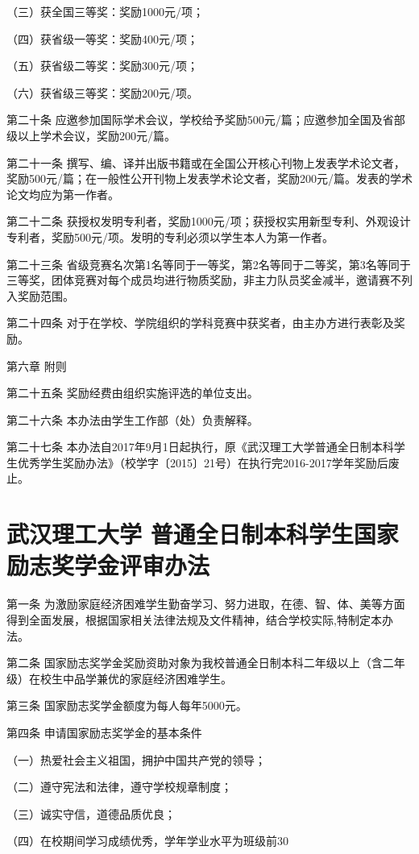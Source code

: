 \documentclass[UTF8,12pt,a4paper]{report}
\begin{document}
（三）获全国三等奖：奖励1000元/项；

（四）获省级一等奖：奖励400元/项；

（五）获省级二等奖：奖励300元/项；

（六）获省级三等奖：奖励200元/项。

第二十条  应邀参加国际学术会议，学校给予奖励500元/篇；应邀参加全国及省部级以上学术会议，奖励200元/篇。

第二十一条  撰写、编、译并出版书籍或在全国公开核心刊物上发表学术论文者，奖励500元/篇；在一般性公开刊物上发表学术论文者，奖励200元/篇。发表的学术论文均应为第一作者。

第二十二条  获授权发明专利者，奖励1000元/项；获授权实用新型专利、外观设计专利者，奖励500元/项。发明的专利必须以学生本人为第一作者。

第二十三条  省级竞赛名次第1名等同于一等奖，第2名等同于二等奖，第3名等同于三等奖，团体竞赛对每个成员均进行物质奖励，非主力队员奖金减半，邀请赛不列入奖励范围。

第二十四条  对于在学校、学院组织的学科竞赛中获奖者，由主办方进行表彰及奖励。



第六章  附则

第二十五条  奖励经费由组织实施评选的单位支出。

第二十六条  本办法由学生工作部（处）负责解释。

第二十七条  本办法自2017年9月1日起执行，原《武汉理工大学普通全日制本科学生优秀学生奖励办法》（校学字〔2015〕21号）在执行完2016-2017学年奖励后废止。
\chapter{武汉理工大学 普通全日制本科学生国家励志奖学金评审办法}
第一条 为激励家庭经济困难学生勤奋学习、努力进取，在德、智、体、美等方面得到全面发展，根据国家相关法律法规及文件精神，结合学校实际,特制定本办法。

第二条 国家励志奖学金奖励资助对象为我校普通全日制本科二年级以上（含二年级）在校生中品学兼优的家庭经济困难学生。

第三条 国家励志奖学金额度为每人每年5000元。

第四条 申请国家励志奖学金的基本条件

（一）热爱社会主义祖国，拥护中国共产党的领导；

（二）遵守宪法和法律，遵守学校规章制度；

（三）诚实守信，道德品质优良；

（四）在校期间学习成绩优秀，学年学业水平为班级前30%
\end{document}
